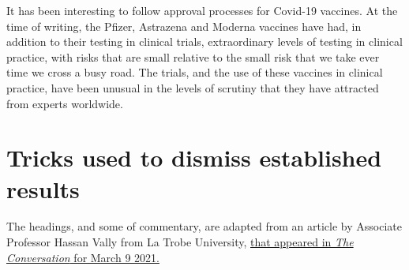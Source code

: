 \documentclass[
  10pt,
  b5paper]{book}
\begin{document}
It has been interesting to follow approval processes
for Covid-19 vaccines. At the time of writing, the
Pfizer, Astrazena and Moderna vaccines have had, in
addition to their testing in clinical trials,
extraordinary levels of testing in clinical practice,
with risks that are small relative to the small risk
that we take ever time we cross a busy road. The
trials, and the use of these vaccines in clinical
practice, have been unusual in the levels of scrutiny
that they have attracted from experts worldwide.

\hypertarget{tricks-used-to-dismiss-established-results}{%
\section{Tricks used to dismiss established results}\label{tricks-used-to-dismiss-established-results}}

The headings, and some of commentary, are adapted from an article by
Associate Professor Hassan Vally from La Trobe University,
\href{https://theconversation.com/5-ways-to-spot-if-someone-is-trying-to-mislead-you-when-it-comes-to-science-138814?utm_medium=email\&utm_campaign=Latest\%20from\%20The\%20Conversation\%20for\%20March\%209\%202021\%20-\%201883318379\&utm_content=Latest\%20from\%20The\%20Conversation\%20for\%20March\%209\%202021\%20-\%201883318379+CID_6009c8d7af2a01f376a88d0491598cfa\&utm_source=campaign_monitor\&utm_term=5\%20ways\%20to\%20spot\%20if\%20someone\%20is\%20trying\%20to\%20mislead\%20you\%20when\%20it\%20comes\%20to\%20science}{that appeared in \emph{The Conversation} for March 9 2021.}
\end{document}
